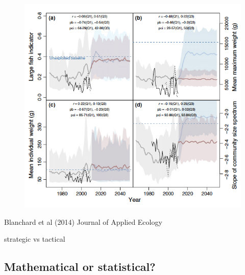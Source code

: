 \documentclass[
  letterpaper,
  DIV=11,
  numbers=noendperiod]{scrartcl}
\begin{document}
\begin{figure}

{\centering \includegraphics{images/blanch2.png}

}

\end{figure}

Blanchard et al (2014) Journal of Applied Ecology

strategic vs tactical

\hypertarget{mathematical-or-statistical}{%
\subsection{Mathematical or
statistical?}\label{mathematical-or-statistical}}
\end{document}
